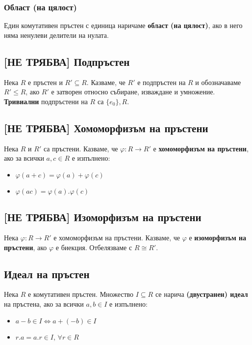 \documentclass[fleqn,12pt]{article}
\begin{document}
\subsubsection{Област (на цялост)}
Един комутативен пръстен с единица наричаме \textbf{област (на цялост)}, ако в него
няма ненулеви делители на нулата.

\subsection{[НЕ ТРЯБВА] Подпръстен}
Нека $R$ е пръстен и $R' \subseteq R$. Казваме, че $R'$ е подпръстен на $R$ и 
обозначаваме $R' \leq R$, ако $R'$ е затворен относно събиране, изваждане и умножение.
\textbf{Тривиални} подпръстени на $R$ са $\{e_0\}, R$.

\subsection{[НЕ ТРЯБВА] Хомоморфизъм на пръстени}
Нека $R$ и $R'$ са пръстени. Казваме, че $\varphi : R \rightarrow R'$ е \textbf{хомоморфизъм на пръстени},
ако за всички $a,c \in R$ е изпълнено:
\begin{itemize}
    \item $\varphi(a + c) = \varphi(a) + \varphi(c)$
    \item $\varphi(ac) = \varphi(a) . \varphi(c)$
\end{itemize}

\subsection{[НЕ ТРЯБВА] Изоморфизъм на пръстени}
Нека $\varphi : R \rightarrow R'$ е хомоморфизъм на пръстени.
Казваме, че $\varphi$ е \textbf{изоморфизъм на пръстени}, ако $\varphi$ е биекция.
Отбелязваме с $R \cong R'$.

\subsection{Идеал на пръстен}
Нека $R$ е комутативен пръстен. Множество $I \subseteq R$ се нарича
\textbf{(двустранен) идеал} на пръстена, ако за всички $a,b \in I$ е изпълнено:
\begin{itemize}
    \item $a - b \in I \Leftrightarrow a + (-b) \in I$
    \item \label{ideal:cond_2} $r.a = a.r \in I$, $\forall r \in R$
\end{itemize}
\end{document}
